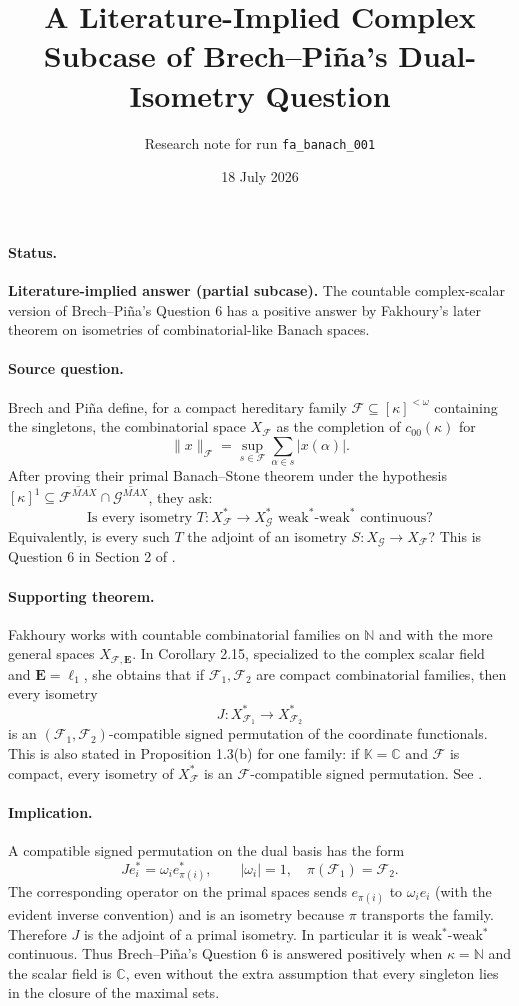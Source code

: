 \documentclass[11pt]{article}
\title{A Literature-Implied Complex Subcase of Brech--Pi\~na's Dual-Isometry Question}
\author{Research note for run \texttt{fa\_banach\_001}}
\date{18 July 2026}
\newcommand{\F}{\mathcal F}
\newcommand{\G}{\mathcal G}
\newcommand{\N}{\mathbb N}
\newcommand{\C}{\mathbb C}
\begin{document}
\maketitle

\paragraph{Status.}
\textbf{Literature-implied answer (partial subcase).}
The countable complex-scalar version of Brech--Pi\~na's Question 6 has a
positive answer by Fakhoury's later theorem on isometries of
combinatorial-like Banach spaces.

\paragraph{Source question.}
Brech and Pi\~na define, for a compact hereditary family
$\F\subseteq[\kappa]^{<\omega}$ containing the singletons, the combinatorial
space $X_\F$ as the completion of $c_{00}(\kappa)$ for
\[
  \|x\|_\F=\sup_{s\in\F}\sum_{\alpha\in s}|x(\alpha)|.
\]
After proving their primal Banach--Stone theorem under the hypothesis
$[\kappa]^1\subseteq\overline{\F^{MAX}}\cap\overline{\G^{MAX}}$, they ask:
\[
\text{Is every isometry }T:X_\F^*\to X_\G^*
\text{ weak}^*\text{-weak}^*\text{ continuous?}
\]
Equivalently, is every such $T$ the adjoint of an isometry
$S:X_\G\to X_\F$?  This is Question 6 in Section 2 of
\cite{BP}.

\paragraph{Supporting theorem.}
Fakhoury works with countable combinatorial families on $\N$ and with the
more general spaces $X_{\F,\mathbf E}$.  In Corollary 2.15, specialized to
the complex scalar field and $\mathbf E=\ell_1$, she obtains that if
$\F_1,\F_2$ are compact combinatorial families, then every isometry
\[
  J:X_{\F_1}^*\longrightarrow X_{\F_2}^*
\]
is an $(\F_1,\F_2)$-compatible signed permutation of the coordinate
functionals.  This is also stated in Proposition 1.3(b) for one family:
if $\mathbb K=\mathbb C$ and $\F$ is compact, every isometry of $X_\F^*$ is
an $\F$-compatible signed permutation.  See \cite[Proposition 1.3 and
Corollary 2.15]{Fakhoury}.

\paragraph{Implication.}
A compatible signed permutation on the dual basis has the form
\[
  J e_i^*=\omega_i e_{\pi(i)}^*,\qquad |\omega_i|=1,\quad
  \pi(\F_1)=\F_2.
\]
The corresponding operator on the primal spaces sends
$e_{\pi(i)}$ to $\omega_i e_i$ (with the evident inverse convention) and is
an isometry because $\pi$ transports the family.  Therefore $J$ is the
adjoint of a primal isometry.  In particular it is
weak$^*$-weak$^*$ continuous.  Thus Brech--Pi\~na's Question 6 is answered
positively when $\kappa=\N$ and the scalar field is $\C$, even without the
extra assumption that every singleton lies in the closure of the maximal
sets.
\end{document}

